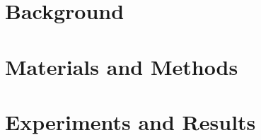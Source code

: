 \documentclass[
\lang{english}{brazilian,brazil}, %
12pt, %
a4paper, %
oneside, %
chapter=TITLE, %
section=TITLE, %
]{setup/ufscthesisx}
\newif\ifforcedinclude\forcedincludefalse
\begin{document}
    \raggedbottom

    \frenchspacing

    \advisor{}{\addGoToSummary}

    

    \textual
    \setlength\beforechapskip{50pt}
    \setlength\midchapskip{20pt}
    \setlength\afterchapskip{20pt}

    \ifforcedinclude\else\part{Background}\fi
    \label{primeira_parte}

    

    

    

    

    \ifforcedinclude\else\part{Materials and Methods}\fi
    \label{segunda_parte}

    

    


    \ifforcedinclude\else\part{Experiments and Results}\fi

    

    
\end{document}
